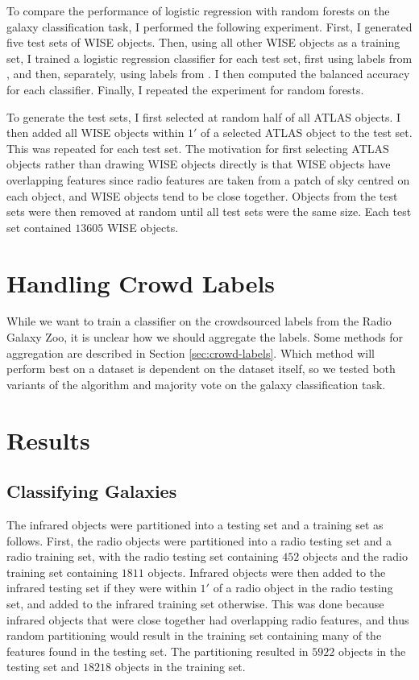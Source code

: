   To compare the performance of logistic regression with random forests on the galaxy classification task, I performed the following experiment. First, I generated five test sets of WISE objects. Then, using all other WISE objects as a training set, I trained a logistic regression classifier for each test set, first using labels from \citet{norris06}, and then, separately, using labels from \citet{fan15}. I then computed the balanced accuracy for each classifier. Finally, I repeated the experiment for random forests.

  To generate the test sets, I first selected at random half of all ATLAS objects. I then added all WISE objects within $1'$ of a selected ATLAS object to the test set. This was repeated for each test set. The motivation for first selecting ATLAS objects rather than drawing WISE objects directly is that WISE objects have overlapping features since radio features are taken from a patch of sky centred on each object, and WISE objects tend to be close together. Objects from the test sets were then removed at random until all test sets were the same size. Each test set contained $13605$ WISE objects.

\section{Handling Crowd Labels}
\label{sec:rgz-crowd-labels}
  
  While we want to train a classifier on the crowdsourced labels from the Radio Galaxy Zoo, it is unclear how we should aggregate the labels. Some methods for aggregation are described in Section \ref{sec:crowd-labels}. Which method will perform best on a dataset is dependent on the dataset itself, so we tested both variants of the \citeauthor{raykar10} algorithm and majority vote on the galaxy classification task.

\section{Results}
\label{sec:passive-results}
  
  \subsection{Classifying Galaxies}


    The infrared objects were partitioned into a testing set and a training set as follows. First, the radio objects were partitioned into a radio testing set and a radio training set, with the radio testing set containing $452$ objects and the radio training set containing $1811$ objects. Infrared objects were then added to the infrared testing set if they were within $1'$ of a radio object in the radio testing set, and added to the infrared training set otherwise. This was done because infrared objects that were close together had overlapping radio features, and thus random partitioning would result in the training set containing many of the features found in the testing set. The partitioning resulted in $5922$ objects in the testing set and $18218$ objects in the training set.

